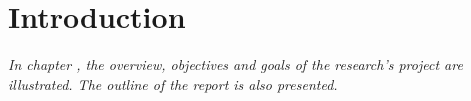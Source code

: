\chapter{Introduction}
\vspace{-1cm}
\vspace{0.2cm}
\textit{In chapter \thechapter, the overview, objectives and goals of the research's project are illustrated. The outline of the report is also presented.}

% 



